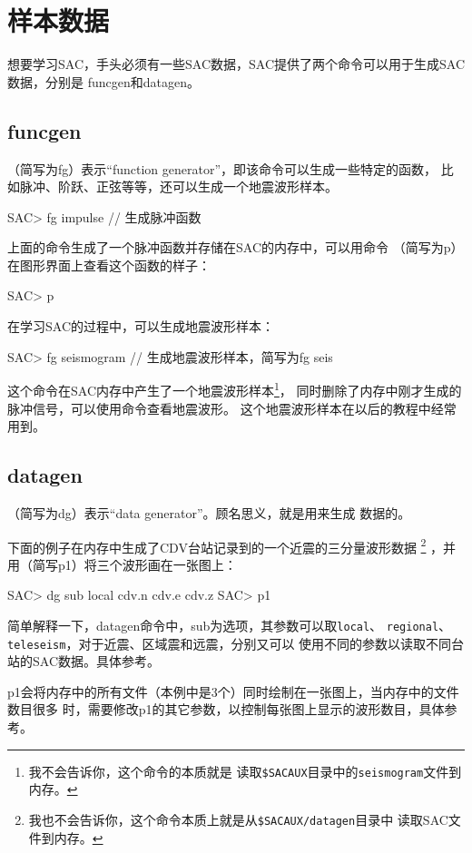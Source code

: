 \section{样本数据}

想要学习SAC，手头必须有一些SAC数据，SAC提供了两个命令可以用于生成SAC数据，分别是
funcgen和datagen。

\subsection{funcgen}
（简写为fg）表示``function generator''，即该命令可以生成一些特定的函数，
比如脉冲、阶跃、正弦等等，还可以生成一个地震波形样本。
\begin{SACCode}
SAC> fg impulse         // 生成脉冲函数
\end{SACCode}
上面的命令生成了一个脉冲函数并存储在SAC的内存中，可以用命令
（简写为p）在图形界面上查看这个函数的样子：
\begin{SACCode}
SAC> p
\end{SACCode}
在学习SAC的过程中，可以生成地震波形样本：
\begin{SACCode}
SAC> fg seismogram      // 生成地震波形样本，简写为fg seis
\end{SACCode}
这个命令在SAC内存中产生了一个地震波形样本\footnote{我不会告诉你，这个命令的本质就是
 读取\lstinline{$SACAUX}目录中的\lstinline{seismogram}文件到内存。}，
同时删除了内存中刚才生成的脉冲信号，可以使用命令查看地震波形。
这个地震波形样本在以后的教程中经常用到。

\subsection{datagen}
（简写为dg）表示``data generator''。顾名思义，就是用来生成
数据的。

下面的例子在内存中生成了CDV台站记录到的一个近震的三分量波形数据
\footnote{我也不会告诉你，这个命令本质上就是从\lstinline{$SACAUX/datagen}目录中
读取SAC文件到内存。}
，并用（简写p1）将三个波形画在一张图上：
\begin{SACCode}
SAC> dg sub local cdv.n cdv.e cdv.z
SAC> p1 
\end{SACCode}
简单解释一下，datagen命令中，sub为选项，其参数可以取\lstinline{local}、
\lstinline{regional}、\lstinline{teleseism}，对于近震、区域震和远震，分别又可以
使用不同的参数以读取不同台站的SAC数据。具体参考。

p1会将内存中的所有文件（本例中是3个）同时绘制在一张图上，当内存中的文件数目很多
时，需要修改p1的其它参数，以控制每张图上显示的波形数目，具体参考。
